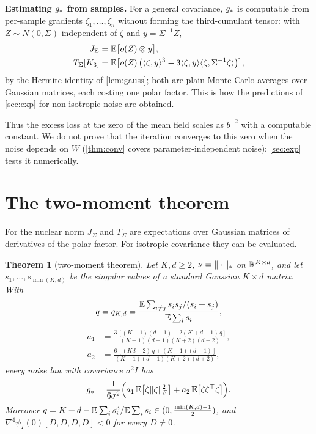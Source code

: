 \documentclass{article}
\theoremstyle{plain}
\newtheorem{theorem}{Theorem}
\theoremstyle{definition}
\theoremstyle{remark}
\begin{document}
\textbf{Estimating $g_\ast$ from samples.} For a general covariance, $g_\ast$ is computable from per-sample gradients
$\zeta_1,\dots,\zeta_n$ without forming the third-cumulant tensor: with $Z\sim N(0,\Sigma)$ independent of $\zeta$ and
$y=\Sigma^{-1}Z$,
\begin{align*}
J_\Sigma&=\mathbb{E}\big[o(Z)\otimes y\big],\\
T_\Sigma[K_3]&=\mathbb{E}\big[o(Z)\,\big(\langle \zeta, y\rangle^3-3\langle \zeta, y\rangle\langle \zeta, \Sigma^{-1}\zeta\rangle\big)\big],
\end{align*}
by the Hermite identity of \cref{lem:gauss}; both are plain Monte-Carlo averages over Gaussian matrices, each costing
one polar factor. This is how the predictions of \cref{sec:exp} for non-isotropic noise are obtained.

Thus the excess loss at the zero of the mean field scales as $b^{-2}$ with a computable constant. We do not prove
that the iteration converges to this zero when the noise depends on $W$ (\cref{thm:conv} covers
parameter-independent noise); \cref{sec:exp} tests it numerically.

\section{The two-moment theorem}\label{sec:two}

For the nuclear norm $J_\Sigma$ and $T_\Sigma$ are expectations over Gaussian matrices of derivatives of the polar
factor. For isotropic covariance they can be evaluated.

\begin{theorem}[two-moment theorem]\label{thm:two}
Let $K,d\ge2$, $\nu=\|\cdot\|_{*}$ on $\mathbb{R}^{K\times d}$, and let $s_1,\dots,s_{\min(K,d)}$ be the singular values of a standard
Gaussian $K\times d$ matrix. With
\begin{equation}\label{eq:q-main}
q=q_{K,d}=\frac{\mathbb{E}\sum_{i\ne j}s_is_j/(s_i+s_j)}{\mathbb{E}\sum_is_i},
\end{equation}
\begin{equation}\label{eq:a-main}
\begin{aligned}
a_1&=\frac{3\,[(K-1)(d-1)-2(K+d+1)\,q]}{(K-1)(d-1)(K+2)(d+2)},\\
a_2&=\frac{6\,[(Kd+2)\,q+(K-1)(d-1)]}{(K-1)(d-1)(K+2)(d+2)},
\end{aligned}
\end{equation}
every noise law with covariance $\sigma^2I$ has
\begin{equation}\label{eq:two-main}
g_\ast=\frac1{6\sigma^2}\Big(a_1\,\mathbb{E}\big[\zeta\|\zeta\|_{F}^2\big]+a_2\,\mathbb{E}\big[\zeta\zeta^\top\zeta\big]\Big).
\end{equation}
Moreover $q=K+d-\mathbb{E}\sum_is_i^3/\mathbb{E}\sum_is_i\in(0,\frac{\min(K,d)-1}2)$, and
$\nabla^4\psi_I(0)[D,D,D,D]<0$ for every $D\ne0$.
\end{theorem}
\end{document}
